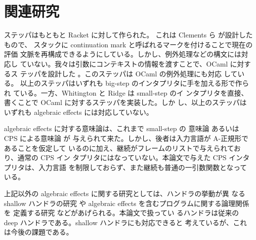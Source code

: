 \section{関連研究}
\label{section:related}

ステッパはもともと Racket に対して作られた。
これは Clements ら \cite{clements01} が設計したもので、
スタックに continuation mark と呼ばれるマークを付けることで現在の評価
文脈を再構成できるようにしている。しかし、例外処理などの構文には対応し
ていない。我々は引数にコンテキストの情報を渡すことで、OCaml に対するス
テッパを設計した \cite{FCA19}。このステッパは OCaml の例外処理にも対応
している。
以上のステッパはいずれも big-step のインタプリタに手を加える形で作られ
ている。一方、Whitington と Ridge \cite{EPTCS294.3} は small-step のイ
ンタプリタを直接、書くことで OCaml に対するステッパを実装した。しか
し、以上のステッパはいずれも algebraic effects には対応していない。

algebraic effects に対する意味論は、これまで small-step の
意味論 \cite{10.1145/2500365.2500590}
あるいは CPS による意味論 \cite{e6cb0c3222794e48bf38cf44e46fe4aa} が
与えられて来た。しかし、後者は入力言語が A-正規形であることを仮定して
いるのに加え、継続がフレームのリストで与えられており、通常の CPS イン
タプリタにはなっていない。本論文で与えた CPS インタプリタは、入力言語
を制限しておらず、また継続も普通の一引数関数となっている。

上記以外の algebraic effects に関する研究としては、ハンドラの挙動が異
なる shallow ハンドラの研究 \cite{10.1007/978-3-030-02768-1_22} や
algebraic effects を含むプログラムに関する論理関係を
定義する研究 \cite{10.1145/3158096} などがあげられる。本論文で扱ってい
るハンドラは従来の deep ハンドラである。shallow ハンドラにも対応できると
考えているが、これは今後の課題である。

